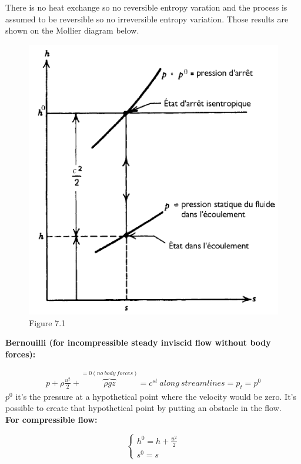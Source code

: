 There is no heat exchange so no reversible entropy varation and the process is assumed to be reversible so no irreversible entropy variation. Those results are shown on the Mollier diagram below.

\begin{figure}[H]
\begin{center}
\includegraphics[scale=0.30]{ch7/chap71.png}
\caption*{Figure 7.1}
\end{center}
\end{figure}

\textbf{Bernouilli (for incompressible steady inviscid flow without body forces):}

\begin{equation}
\begin{aligned}
p+\rho \frac{u^2}{2} +\overbrace{\rho gz}^{=0 (no\ body\ forces)} =c^{st} \ along \ streamlines=p_t=p^0
\end{aligned}
\end{equation}
$p^0$ it's the pressure at a hypothetical point where the velocity would be zero. It's possible to create that hypothetical point by putting an obstacle in the flow.
\\

\textbf{For compressible flow:}

\begin{equation}
\left\{
    \begin{array}{ll}
    h^0=h+\frac{u^2}{2}  \\
    s^0=s
    \end{array}
\right.
\end{equation}

